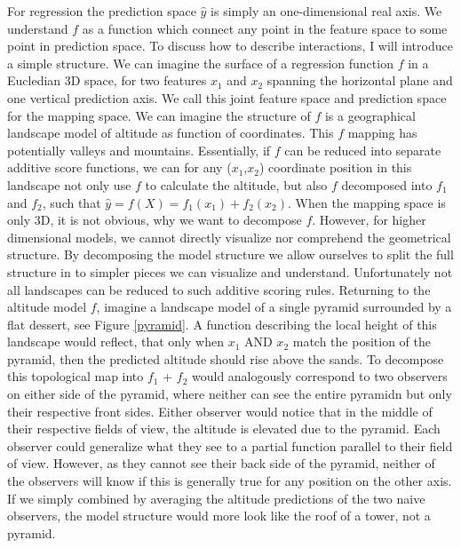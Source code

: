 For regression the prediction space $\hat{y}$ is simply an one-dimensional real axis. We understand $f$ as a function which connect any point in the feature space to some point in prediction space. To discuss how to describe interactions, I will introduce a simple structure. We can imagine the surface of a regression function $f$ in a Eucledian 3D space, for two features $x_1$ and $x_2$ spanning the horizontal plane and one vertical prediction axis. We call this joint feature space and prediction space for the mapping space. We can imagine the structure of $f$ is a geographical landscape model of altitude as function of coordinates. This $f$ mapping has potentially valleys and mountains. Essentially, if $f$ can be reduced into separate additive score functions, we can for any ($x_1$,$x_2$) coordinate position in this landscape not only use $f$ to calculate the altitude, but also $f$ decomposed into $f_1$ and $f_2$, such that $\hat{y} = f(X) = f_1(x_1) + f_2(x_2)$. When the mapping space is only 3D, it is not obvious, why we want to decompose $f$. However, for higher dimensional models, we cannot directly visualize nor comprehend the geometrical structure. By decomposing the model structure we allow ourselves to split the full structure in to simpler pieces we can visualize and understand. Unfortunately not all landscapes can be reduced to such additive scoring rules. Returning to the altitude model $f$, imagine a landscape model of a single pyramid surrounded by a flat dessert, see Figure \ref{pyramid}. A function describing the local height of this landscape would reflect, that only when $x_1$ AND $x_2$ match the position of the pyramid, then the predicted altitude should rise above the sands. To decompose this topological map into $f_1$ + $f_2$ would analogously correspond to two observers on either side of the pyramid, where neither can see the entire pyramidn but only their respective front sides. Either observer would notice that in the middle of their respective fields of view, the altitude is elevated due to the pyramid. Each observer could generalize what they see to a partial function parallel to their field of view. However, as they cannot see their back side of the pyramid, neither of the observers will know if this is generally true for any position on the other axis. If we simply combined by averaging the altitude predictions of the two naive observers, the model structure would more look like the roof of a tower, not a pyramid. 

